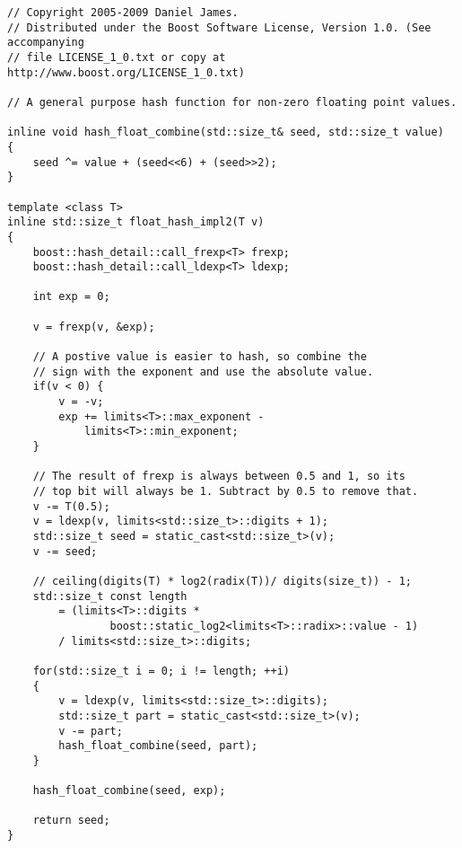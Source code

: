 \begin{lstlisting}[label=lst:hash-float-function, caption=Code to Hash Single 32-bit Floating Point Value (Source code from file \texttt{boost/functional/hash/detail/hash\_float\_generic.hpp} in Boost Library 1.42.0)]
// Copyright 2005-2009 Daniel James.
// Distributed under the Boost Software License, Version 1.0. (See accompanying
// file LICENSE_1_0.txt or copy at http://www.boost.org/LICENSE_1_0.txt)

// A general purpose hash function for non-zero floating point values.

inline void hash_float_combine(std::size_t& seed, std::size_t value)
{
    seed ^= value + (seed<<6) + (seed>>2);
}

template <class T>
inline std::size_t float_hash_impl2(T v)
{
    boost::hash_detail::call_frexp<T> frexp;
    boost::hash_detail::call_ldexp<T> ldexp;

    int exp = 0;

    v = frexp(v, &exp);

    // A postive value is easier to hash, so combine the
    // sign with the exponent and use the absolute value.
    if(v < 0) {
        v = -v;
        exp += limits<T>::max_exponent -
            limits<T>::min_exponent;
    }

    // The result of frexp is always between 0.5 and 1, so its
    // top bit will always be 1. Subtract by 0.5 to remove that.
    v -= T(0.5);
    v = ldexp(v, limits<std::size_t>::digits + 1);
    std::size_t seed = static_cast<std::size_t>(v);
    v -= seed;

    // ceiling(digits(T) * log2(radix(T))/ digits(size_t)) - 1;
    std::size_t const length
        = (limits<T>::digits *
                boost::static_log2<limits<T>::radix>::value - 1)
        / limits<std::size_t>::digits;

    for(std::size_t i = 0; i != length; ++i)
    {
        v = ldexp(v, limits<std::size_t>::digits);
        std::size_t part = static_cast<std::size_t>(v);
        v -= part;
        hash_float_combine(seed, part);
    }

    hash_float_combine(seed, exp);

    return seed;
}
\end{lstlisting}